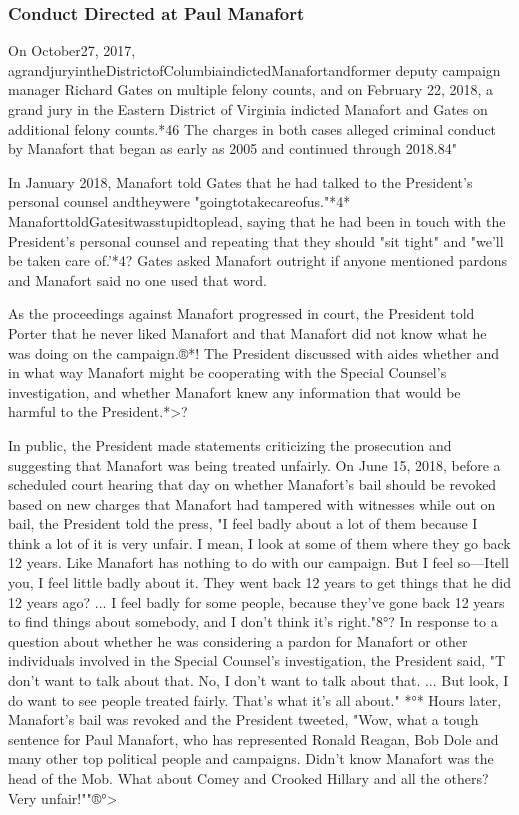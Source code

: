 \subsubsection{Conduct Directed at Paul Manafort}

On October27, 2017, agrandjuryintheDistrictofColumbiaindictedManafortandformer deputy campaign manager Richard Gates on multiple felony counts, and on February 22, 2018, a grand jury in the Eastern District of Virginia indicted Manafort and Gates on additional felony counts.*46
The charges in both cases alleged criminal conduct by Manafort that began as early as 2005 and continued through 2018.84"

In January 2018, Manafort told Gates that he had talked to the President's personal counsel andtheywere "goingtotakecareofus."*4*
ManaforttoldGatesitwasstupidtoplead, saying that he had been in touch with the President's personal counsel and repeating that they should "sit tight" and "we'll be taken care of.'*4?
Gates asked Manafort outright if anyone mentioned pardons and Manafort said no one used that word.

As the proceedings against Manafort progressed in court, the President told Porter that he never liked Manafort and that Manafort did not know what he was doing on the campaign.®*!
The President discussed with aides whether and in what way Manafort might be cooperating with the Special Counsel's investigation, and whether Manafort knew any information that would be harmful to the President.*>?

In public, the President made statements criticizing the prosecution and suggesting that Manafort was being treated unfairly.
On June 15, 2018, before a scheduled court hearing that day on whether Manafort's bail should be revoked based on new charges that Manafort had tampered with witnesses while out on bail, the President told the press, "I feel badly about a lot of them because I think a lot of it is very unfair.
I mean, I look at some of them where they go back 12 years.
Like Manafort has nothing to do with our campaign.
But I feel so—Itell you, I feel little badly about it.
They went back 12 years to get things that he did 12 years ago? ...
I feel badly for some people, because they've gone back 12 years to find things about somebody, and I don't think it's right."8°?
In response to a question about whether he was considering a pardon for Manafort or other individuals involved in the Special Counsel's investigation, the President said, "T don't want to talk about that.
No, I don't want to talk about that. ...
But look, I do want to see people treated fairly.
That's what it's all about." *°*
Hours later, Manafort's bail was revoked and the President tweeted, "Wow, what a tough sentence for Paul Manafort, who has represented Ronald Reagan, Bob Dole and many other top political people and campaigns.
Didn't know Manafort was the head of the Mob.
What about Comey and Crooked Hillary and all the others? Very unfair!""®°>

